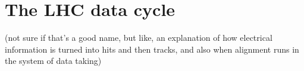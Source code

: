 \section{The LHC data cycle}
\label{sec:datacycle}

(not sure if that's a good name, but like, an explanation of how electrical information is turned into hits and then tracks, and also when alignment runs in the system of data taking)



